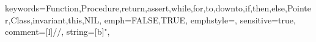 {keywords={Function,Procedure,return,assert,while,for,to,downto,if,then,else,Pointer,Class,invariant,this,NIL},%
emph={FALSE,TRUE},
emphstyle=\color{colconst},
sensitive=true,%
comment=[l]{//},%
string=[b]",%
}
